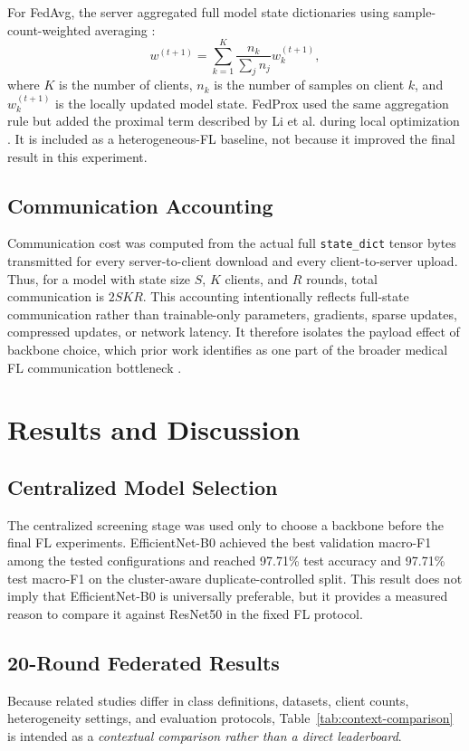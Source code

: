 \documentclass[10pt,twocolumn]{article}
\begin{document}
For FedAvg, the server aggregated full model state dictionaries using sample-count-weighted averaging \cite{mcmahan2017fedavg}:
\begin{equation}
    w^{(t+1)} = \sum_{k=1}^{K} \frac{n_k}{\sum_j n_j} w_k^{(t+1)},
\end{equation}
where $K$ is the number of clients, $n_k$ is the number of samples on client $k$, and $w_k^{(t+1)}$ is the locally updated model state. FedProx used the same aggregation rule but added the proximal term described by Li et al. during local optimization \cite{li2020fedprox}. It is included as a heterogeneous-FL baseline, not because it improved the final result in this experiment.

\subsection{Communication Accounting}
Communication cost was computed from the actual full \texttt{state\_dict} tensor bytes transmitted for every server-to-client download and every client-to-server upload. Thus, for a model with state size $S$, $K$ clients, and $R$ rounds, total communication is $2SKR$. This accounting intentionally reflects full-state communication rather than trainable-only parameters, gradients, sparse updates, compressed updates, or network latency. It therefore isolates the payload effect of backbone choice, which prior work identifies as one part of the broader medical FL communication bottleneck \cite{radhika2026communication,zhou2022communication,das2026federated}.

\section{Results and Discussion}
\subsection{Centralized Model Selection}
The centralized screening stage was used only to choose a backbone before the final FL experiments. EfficientNet-B0 achieved the best validation macro-F1 among the tested configurations and reached 97.71\% test accuracy and 97.71\% test macro-F1 on the cluster-aware duplicate-controlled split. This result does not imply that EfficientNet-B0 is universally preferable, but it provides a measured reason to compare it against ResNet50 in the fixed FL protocol.

\subsection{20-Round Federated Results}
Because related studies differ in class definitions, datasets, client counts, heterogeneity settings, and evaluation protocols, Table~\ref{tab:context-comparison} is intended as a \textit{contextual comparison rather than a direct leaderboard}.
\end{document}

